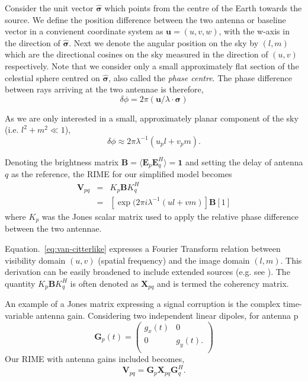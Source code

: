 Consider the unit vector $\hat{\bm{\sigma}}$ which points from the centre of the Earth towards the source. We define the position difference between the two antenna or baseline vector in a convienent coordinate system as $\bm{u} = (u,v,w)$,  with the w-axis in the direction of $\hat{\bm{\sigma}}$. Next we denote the angular position on the sky by $(l, m)$ which are the directional cosines on the sky measured in the direction of $(u, v)$ respectively. Note that we consider only a small approximately flat section of the celestial sphere centred on $\hat{\bm{\sigma}}$, also called the \emph{phase centre}. The phase difference between rays arriving at the two antennae is therefore,
\begin{equation}
 \delta \phi = 2\pi (\bm{u}/\lambda \cdot \bm{\sigma})
\end{equation}


As we are only interested in a small, approximately planar component of the sky (i.e. $l^2 +m^2 \ll 1$),
\begin{equation}
 \delta \phi \approx 2\pi \lambda^{-1} (u_pl +v_pm).
\end{equation}

Denoting the brightness matrix $\bm{B} = \langle {\bm E}_p  {\bm E}_q^H \rangle = \bm{1} $ and setting the delay of antenna $q$ as the reference, the RIME for our simplified model becomes
\begin{eqnarray}\label{eq:van-citterlike}
\bm{V}_{pq} &=& K_p \bm{B} K_q^H \\
&=&  \left[\exp (2\pi i \lambda^{-1} (ul +vm)\right] \bm{B} \left[1\right]
\end{eqnarray}
where $K_{p}$ was the Jones scalar matrix used to apply the relative phase difference between the two antennae.


Equation.~\ref{eq:van-citterlike} expresses a Fourier Transform relation between visibility domain $(u,v)$ (spatial frequency) and the image domain $(l,m)$. This derivation can be easily broadened to include extended sources (e.g. see \citep{Smirnov_2011a}). The quantity  $K_p \bm{B} K_q^H$ is often denoted as $\bm{X}_{pq}$ and is termed the coherency matrix.


An example of a Jones matrix expressing a signal corruption is the complex time-variable antenna gain. Considering two independent linear dipoles,  for antenna p
\begin{equation}\label{eq:G_jones}
\bm{G}_p(t) =
\left(
\begin{array}{cc}
g_x (t)&0\\
0 & g_y (t). \\
\end{array}
\right)
\end{equation}
Our RIME with antenna gains included becomes,
\begin{equation}\label{eq:G_rime}
\bm{V}_{pq} = \bm G_p \bm{X}_{pq} \bm G_q^H.
\end{equation}

